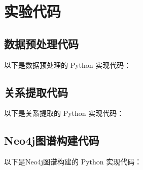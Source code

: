 \chapter{实验代码}


\section{数据预处理代码}

以下是数据预处理的 Python 实现代码：



\section{关系提取代码}

以下是关系提取的 Python 实现代码：



\section{Neo4j图谱构建代码}

以下是Neo4j图谱构建的 Python 实现代码：

